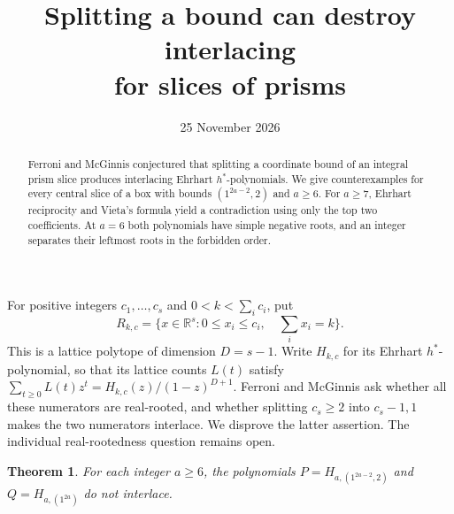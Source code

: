 \documentclass[11pt]{article}
\title{Splitting a bound can destroy interlacing\protect\\for slices of prisms}
\author{}
\date{25 November 2026}
\newtheorem{theorem}{Theorem}
\begin{document}
\maketitle
\begin{abstract}
Ferroni and McGinnis conjectured that splitting a coordinate bound of
an integral prism slice produces interlacing Ehrhart $h^*$-polynomials.
We give counterexamples for every central slice of a box with bounds
$(1^{2a-2},2)$ and $a\ge6$. For $a\ge7$, Ehrhart reciprocity and
Vieta's formula yield a contradiction using only the top two coefficients.
At $a=6$ both polynomials have simple negative roots, and an integer
separates their leftmost roots in the forbidden order.
\end{abstract}

For positive integers $c_1,\ldots,c_s$ and $0<k<\sum_i c_i$, put
\[
 R_{k,c}=\{x\in\mathbb R^s:0\le x_i\le c_i,\quad \textstyle\sum_i x_i=k\}.
\]
This is a lattice polytope of dimension $D=s-1$. Write $H_{k,c}$ for its
Ehrhart $h^*$-polynomial, so that its lattice counts $L(t)$ satisfy
$\sum_{t\ge0} L(t)z^t=H_{k,c}(z)/(1-z)^{D+1}$.
Ferroni and McGinnis \cite[Conjecture~5.12]{fm} ask whether all these
numerators are real-rooted, and whether splitting $c_s\ge2$ into
$c_s-1,1$ makes the two numerators interlace. We disprove the latter
assertion. The individual real-rootedness question remains open.

\begin{theorem}
For each integer $a\ge6$, the polynomials
$P=H_{a,(1^{2a-2},2)}$ and $Q=H_{a,(1^{2a})}$ do not interlace.
\end{theorem}
\end{document}
